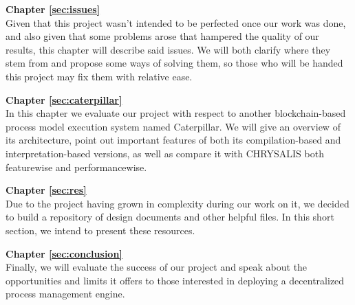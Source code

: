 \textbf{Chapter \ref{sec:issues}} \\[0.2em]
Given that this project wasn't intended to be perfected once our work was done, and also given that some problems arose that hampered the quality of our results, this chapter will describe said issues. We will both clarify where they stem from and propose some ways of solving them, so those who will be handed this project may fix them with relative ease.
\pagebreak

\textbf{Chapter \ref{sec:caterpillar}} \\[0.2em]
In this chapter we evaluate our project with respect to another blockchain-based process model execution system named Caterpillar. We will give an overview of its architecture, point out important features of both its compilation-based and interpretation-based versions, as well as compare it with CHRYSALIS both featurewise and performancewise.

\textbf{Chapter \ref{sec:res}} \\[0.2em]
Due to the project having grown in complexity during our work on it, we decided to build a repository of design documents and other helpful files. In this short section, we intend to present these resources.

\textbf{Chapter \ref{sec:conclusion}} \\[0.2em]
Finally, we will evaluate the success of our project and speak about the opportunities and limits it offers to those interested in deploying a decentralized process management engine.
